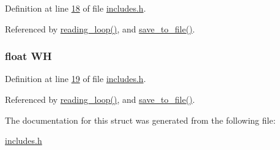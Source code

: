 Definition at line \hyperlink{a00037_source_l00018}{18} of file \hyperlink{a00037_source}{includes.\-h}.



Referenced by \hyperlink{a00035_source_l00302}{reading\-\_\-loop()}, and \hyperlink{a00035_source_l00421}{save\-\_\-to\-\_\-file()}.

\hypertarget{a00030_a8dd6d8406db4e214238b3eff481e4ea0}{
\subsubsection[{W\-H}]{\setlength{\rightskip}{0pt plus 5cm}float W\-H}}\label{d5/d79/a00030_a8dd6d8406db4e214238b3eff481e4ea0}


Definition at line \hyperlink{a00037_source_l00019}{19} of file \hyperlink{a00037_source}{includes.\-h}.



Referenced by \hyperlink{a00035_source_l00302}{reading\-\_\-loop()}, and \hyperlink{a00035_source_l00421}{save\-\_\-to\-\_\-file()}.



The documentation for this struct was generated from the following file\-:\begin{DoxyCompactItemize}
\item 
\hyperlink{a00037}{includes.\-h}\end{DoxyCompactItemize}
